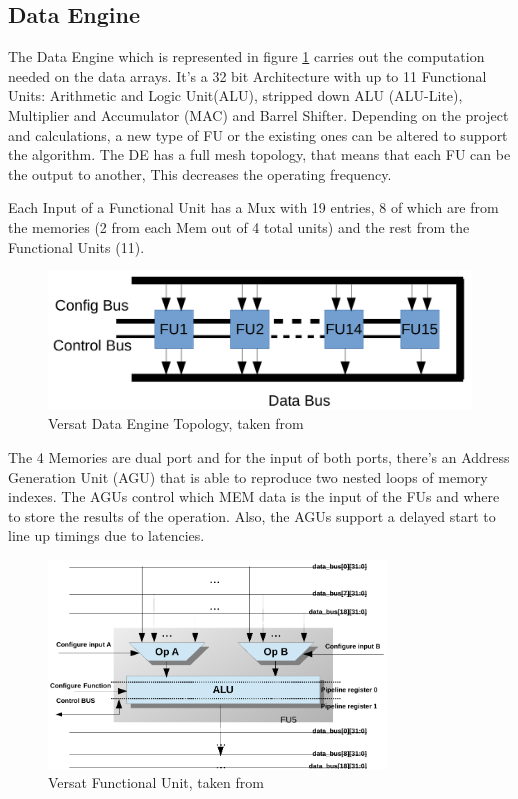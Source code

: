 \subsection{Data Engine}
\quad The Data Engine which is represented in figure \ref{figure:DE} carries out the computation needed on the data arrays. It's a 32 bit Architecture with up to 11 Functional Units:
 Arithmetic and Logic Unit(ALU), stripped down ALU (ALU-Lite),
 Multiplier and Accumulator (MAC) and Barrel Shifter.
 Depending on the project and calculations, a new type of FU or the existing ones can be altered to support the algorithm.
 The DE has a full mesh  topology, that means that each FU can be the output to another, This decreases the operating frequency.

 Each Input of a Functional Unit has a Mux with 19 entries, 8 of which are from the memories (2 from each Mem out of 4 total units) and the rest from the Functional Units (11).

 \begin{figure}[!htbp]
    \centering
    \includegraphics[width=1\textwidth]{Figures/de.png}
    \caption{Versat Data Engine Topology, taken from~\cite{sousa:FFT}}
    \label{figure:DE}
\end{figure} 

 The 4 Memories are dual port and for the input of both ports, 
 there's an Address Generation Unit (AGU) that is able to 
 reproduce two nested loops of memory indexes.
 The AGUs control which MEM data is the input of the FUs and where
 to store the results of the operation. Also, the AGUs support a delayed start to line up timings
due to latencies.

\begin{figure}[!htbp]
    \centering
    \includegraphics[width=0.8\textwidth]{Figures/fu.pdf}
    \caption{Versat Functional Unit, taken from~\cite{lopes:versat}}
    \label{figure:FU}
\end{figure} 


